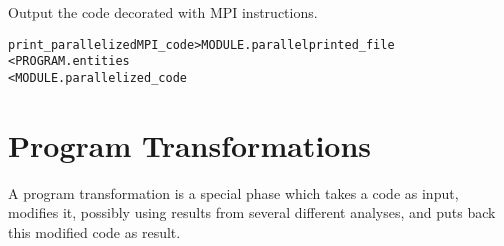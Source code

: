 \documentclass[a4paper]{report}
\newenvironment{PipsMake}{\begin{alltt}}{\end{alltt}}
\newenvironment{PipsPass}[1]{\label{pass:#1}}{}
\begin{document}
\begin{PipsPass}{print_parallelizedMPI_code}
Output the code decorated with MPI instructions.
\end{PipsPass}

\begin{PipsMake}
print_parallelizedMPI_code     > MODULE.parallelprinted_file
        < PROGRAM.entities
        < MODULE.parallelized_code
\end{PipsMake}




\chapter{Program Transformations}
\label{section-program-transformations}

\begin{PipsPass}{TheTransformations}
A program transformation is a special phase which takes a code as
input, modifies it, possibly using results from several different
analyses, and puts back this modified code as result.
\end{PipsPass}
\end{document}
